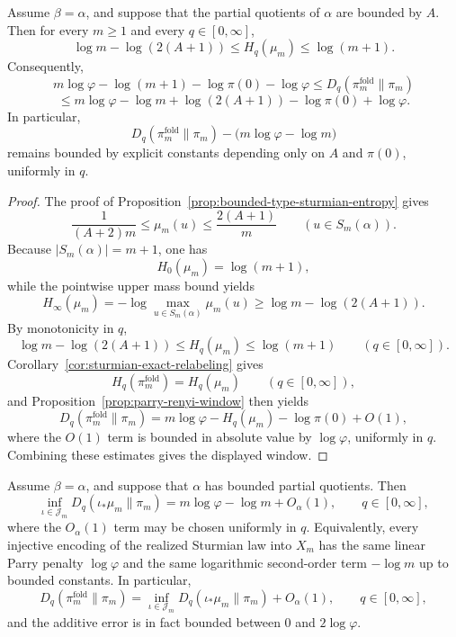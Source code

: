\begin{proposition}\label{prop:explicit-bounded-type-kl-window}
Assume \(\beta=\alpha\), and suppose that the partial quotients of \(\alpha\)
are bounded by \(A\). Then for every \(m\ge 1\) and every \(q\in[0,\infty]\),
\[
\log m-\log(2(A+1))
\le
H_q(\mu_m)
\le
\log(m+1).
\]
Consequently,
\[
m\log\varphi-\log(m+1)-\log\pi(0)-\log\varphi
\le
D_q(\pi_m^{\mathrm{fold}}\|\pi_m)
\]
\[
\le
m\log\varphi-\log m+\log(2(A+1))-\log\pi(0)+\log\varphi.
\]
In particular,
\[
D_q(\pi_m^{\mathrm{fold}}\|\pi_m)
-
\bigl(m\log\varphi-\log m\bigr)
\]
remains bounded by explicit constants depending only on \(A\) and \(\pi(0)\),
uniformly in \(q\).
\end{proposition}

\begin{proof}
The proof of Proposition~\ref{prop:bounded-type-sturmian-entropy} gives
\[
\frac{1}{(A+2)m}\le \mu_m(u)\le \frac{2(A+1)}{m}
\qquad (u\in S_m(\alpha)).
\]
Because \(|S_m(\alpha)|=m+1\), one has
\[
H_0(\mu_m)=\log(m+1),
\]
while the pointwise upper mass bound yields
\[
H_\infty(\mu_m)
=
-\log\max_{u\in S_m(\alpha)}\mu_m(u)
\ge
\log m-\log(2(A+1)).
\]
By monotonicity in \(q\),
\[
\log m-\log(2(A+1))
\le
H_q(\mu_m)
\le
\log(m+1)
\qquad (q\in[0,\infty]).
\]
Corollary~\ref{cor:sturmian-exact-relabeling} gives
\[
H_q(\pi_m^{\mathrm{fold}})=H_q(\mu_m)
\qquad (q\in[0,\infty]),
\]
and Proposition~\ref{prop:parry-renyi-window} then yields
\[
D_q(\pi_m^{\mathrm{fold}}\|\pi_m)
=
m\log\varphi-H_q(\mu_m)-\log\pi(0)+O(1),
\]
where the \(O(1)\) term is bounded in absolute value by \(\log\varphi\),
uniformly in \(q\). Combining these estimates gives the displayed window.
\end{proof}

\begin{corollary}
\label{cor:injective-relabeling-bounded-type}
Assume \(\beta=\alpha\), and suppose that \(\alpha\) has bounded partial
quotients. Then
\[
\inf_{\iota\in\mathcal J_m}D_q(\iota_*\mu_m\|\pi_m)
=
m\log\varphi-\log m+O_\alpha(1),
\qquad q\in[0,\infty],
\]
where the \(O_\alpha(1)\) term may be chosen uniformly in \(q\). Equivalently,
every injective encoding of the realized Sturmian law into \(X_m\) has the same
linear Parry penalty \(\log\varphi\) and the same logarithmic second-order term
\(-\log m\) up to bounded constants. In particular,
\[
D_q(\pi_m^{\mathrm{fold}}\|\pi_m)
=
\inf_{\iota\in\mathcal J_m}D_q(\iota_*\mu_m\|\pi_m)+O_\alpha(1),
\qquad q\in[0,\infty],
\]
and the additive error is in fact bounded between \(0\) and \(2\log\varphi\).
\end{corollary}

